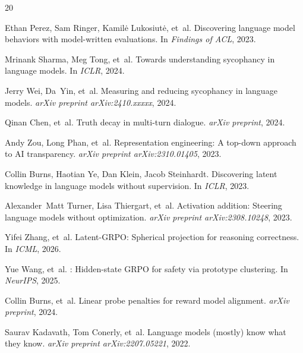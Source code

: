 \documentclass[11pt,a4paper]{article}
\begin{document}

\begin{thebibliography}{20}

Ethan Perez, Sam Ringer, Kamil\.{e} Lukosiut\.{e}, et~al.
\newblock Discovering language model behaviors with model-written evaluations.
\newblock In \emph{Findings of ACL}, 2023.

Mrinank Sharma, Meg Tong, et~al.
\newblock Towards understanding sycophancy in language models.
\newblock In \emph{ICLR}, 2024.

Jerry Wei, Da~Yin, et~al.
\newblock Measuring and reducing sycophancy in language models.
\newblock \emph{arXiv preprint arXiv:2410.xxxxx}, 2024.

Qinan Chen, et~al.
\newblock Truth decay in multi-turn dialogue.
\newblock \emph{arXiv preprint}, 2024.

Andy Zou, Long Phan, et~al.
\newblock Representation engineering: A top-down approach to {AI} transparency.
\newblock \emph{arXiv preprint arXiv:2310.01405}, 2023.

Collin Burns, Haotian Ye, Dan Klein, Jacob Steinhardt.
\newblock Discovering latent knowledge in language models without supervision.
\newblock In \emph{ICLR}, 2023.

Alexander~Matt Turner, Lisa Thiergart, et~al.
\newblock Activation addition: Steering language models without optimization.
\newblock \emph{arXiv preprint arXiv:2308.10248}, 2023.

Yifei Zhang, et~al.
\newblock Latent-{GRPO}: Spherical projection for reasoning correctness.
\newblock In \emph{ICML}, 2026.

Yue Wang, et~al.
: Hidden-state {GRPO} for safety via prototype clustering.
\newblock In \emph{NeurIPS}, 2025.

Collin Burns, et~al.
\newblock Linear probe penalties for reward model alignment.
\newblock \emph{arXiv preprint}, 2024.

Saurav Kadavath, Tom Conerly, et~al.
\newblock Language models (mostly) know what they know.
\newblock \emph{arXiv preprint arXiv:2207.05221}, 2022.


\end{thebibliography}
\end{document}
